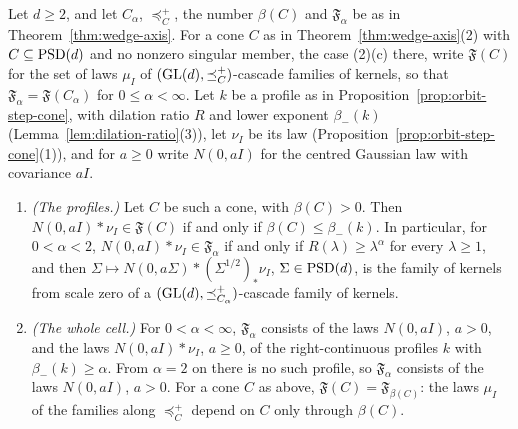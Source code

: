 \begin{proposition}\label{prop:wedge-axis-profiles}
Let $d \ge 2$, and let $C_\alpha$, $\preceq^+_C$, the number $\beta(C)$ and $\mathfrak F_\alpha$ be as in
Theorem~\ref{thm:wedge-axis}. For a cone $C$ as in Theorem~\ref{thm:wedge-axis}(2) with $C \subseteq \mathrm{PSD}(d)$ and no nonzero
singular member, the case (2)(c) there, write $\mathfrak F(C)$ for the set of laws $\mu_I$ of
$(\mathrm{GL}(d), \preceq^+_C)$-cascade families of kernels, so that $\mathfrak F_\alpha = \mathfrak F(C_\alpha)$ for
$0 \le \alpha < \infty$. Let $k$ be a profile as in Proposition~\ref{prop:orbit-step-cone}, with dilation
ratio $R$ and lower exponent $\beta_-(k)$ (Lemma~\ref{lem:dilation-ratio}(3)), let $\nu_I$ be its law
(Proposition~\ref{prop:orbit-step-cone}(1)), and for $a \ge 0$ write $N(0, aI)$ for the centred Gaussian law with
covariance $aI$.
\begin{enumerate}
\item \emph{(The profiles.)} Let $C$ be such a cone, with $\beta(C) > 0$. Then $N(0, aI) * \nu_I \in \mathfrak F(C)$
if and only if $\beta(C) \le \beta_-(k)$. In particular, for $0 < \alpha < 2$, $N(0, aI) * \nu_I \in \mathfrak F_\alpha$
if and only if $R(\lambda) \ge \lambda^\alpha$ for every $\lambda \ge 1$, and then
$\Sigma \mapsto N(0, a\Sigma) * (\Sigma^{1/2})_*\nu_I$, $\Sigma \in \mathrm{PSD}(d)$, is the family of kernels from scale
zero of a $(\mathrm{GL}(d), \preceq^+_{C_\alpha})$-cascade family of kernels.
\item \emph{(The whole cell.)} For $0 < \alpha < \infty$, $\mathfrak F_\alpha$ consists of the laws $N(0, aI)$, $a > 0$,
and the laws $N(0, aI) * \nu_I$, $a \ge 0$, of the right-continuous profiles $k$ with $\beta_-(k) \ge \alpha$.
From $\alpha = 2$ on there is no such profile, so $\mathfrak F_\alpha$ consists of the laws $N(0, aI)$, $a > 0$.
For a cone $C$ as above, $\mathfrak F(C) = \mathfrak F_{\beta(C)}$: the laws $\mu_I$ of the families
along $\preceq^+_C$ depend on $C$ only through $\beta(C)$.
\end{enumerate}
\end{proposition}


